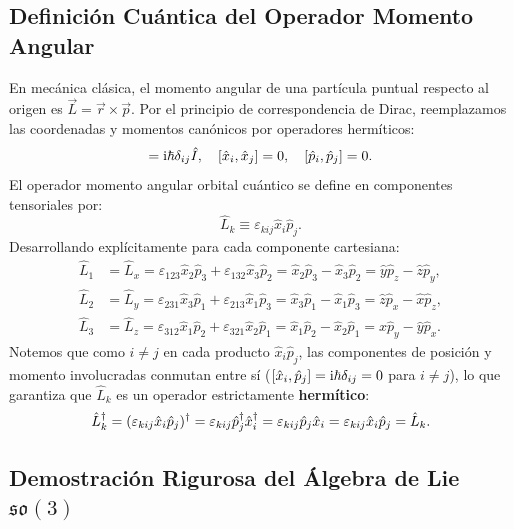 \subsection{Definición Cuántica del Operador Momento Angular}

En mecánica clásica, el momento angular de una partícula puntual respecto al origen es $\vec{L} = \vec{r} \times \vec{p}$. Por el principio de correspondencia de Dirac, reemplazamos las coordenadas y momentos canónicos por operadores hermíticos:
\begin{equation}
    [\hat{x}_i, \hat{p}_j] = \iu\hbar\delta_{ij}\hat{I}, \quad [\hat{x}_i, \hat{x}_j] = 0, \quad [\hat{p}_i, \hat{p}_j] = 0.
    \label{eq:canonical_comm_3d}
\end{equation}
El operador momento angular orbital cuántico se define en componentes tensoriales por:
\begin{equation}
    \boxed{\hat{L}_k \equiv \varepsilon_{kij}\hat{x}_i\hat{p}_j}.
    \label{eq:l_operator_def}
\end{equation}
Desarrollando explícitamente para cada componente cartesiana:
\begin{align}
    \hat{L}_1 &= \hat{L}_x = \varepsilon_{123}\hat{x}_2\hat{p}_3 + \varepsilon_{132}\hat{x}_3\hat{p}_2 = \hat{x}_2\hat{p}_3 - \hat{x}_3\hat{p}_2 = \hat{y}\hat{p}_z - \hat{z}\hat{p}_y, \\
    \hat{L}_2 &= \hat{L}_y = \varepsilon_{231}\hat{x}_3\hat{p}_1 + \varepsilon_{213}\hat{x}_1\hat{p}_3 = \hat{x}_3\hat{p}_1 - \hat{x}_1\hat{p}_3 = \hat{z}\hat{p}_x - \hat{x}\hat{p}_z, \\
    \hat{L}_3 &= \hat{L}_z = \varepsilon_{312}\hat{x}_1\hat{p}_2 + \varepsilon_{321}\hat{x}_2\hat{p}_1 = \hat{x}_1\hat{p}_2 - \hat{x}_2\hat{p}_1 = \hat{x}\hat{p}_y - \hat{y}\hat{p}_x.
\end{align}
Notemos que como $i \neq j$ en cada producto $\hat{x}_i\hat{p}_j$, las componentes de posición y momento involucradas conmutan entre sí ($[\hat{x}_i, \hat{p}_j] = \mathrm{i}\hbar\delta_{ij} = 0$ para $i \neq j$), lo que garantiza que $\hat{L}_k$ es un operador estrictamente \textbf{hermítico}:
\begin{equation}
    \hat{L}_k^\dagger = (\varepsilon_{kij}\hat{x}_i\hat{p}_j)^\dagger = \varepsilon_{kij}\hat{p}_j^\dagger\hat{x}_i^\dagger = \varepsilon_{kij}\hat{p}_j\hat{x}_i = \varepsilon_{kij}\hat{x}_i\hat{p}_j = \hat{L}_k.
\end{equation}

\subsection{Demostración Rigurosa del Álgebra de Lie \texorpdfstring{$\mathfrak{so}(3)$}{so(3)}}

